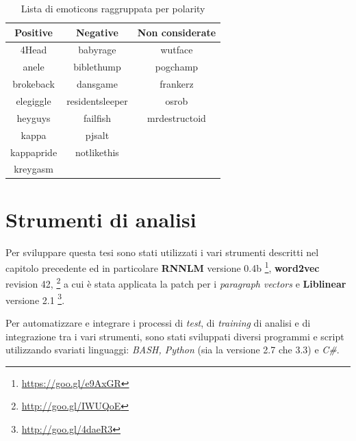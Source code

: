 \documentclass[a4paper,12pt,openright,twoside]{report}
\theoremstyle{definition}
\begin{document}
\begin{table}[H]
\begin{center}
\begin{tabular}{|c|c|c|}
\hline
Positive & Negative & Non considerate \\
\hline
4Head & babyrage & wutface \\
\hline
anele &  biblethump &  pogchamp \\
\hline
brokeback &  dansgame & frankerz \\
\hline
elegiggle & residentsleeper &  osrob \\
\hline
heyguys & failfish & mrdestructoid \\
\hline
kappa & pjsalt & \\
\hline
kappapride & notlikethis & \\
\hline
kreygasm &  & \\
\hline
\end{tabular}
\end{center}
\caption{Lista di emoticons raggruppata per polarity}
\label{tab:emoticons2}
\end{table}

  
\section{Strumenti di analisi}
Per sviluppare questa tesi sono stati utilizzati i vari strumenti descritti 
nel capitolo precedente
ed in particolare \textbf{RNNLM} versione 0.4b \footnote{\url{https://goo.gl/e9AxGR}}, 
\textbf{word2vec} revision 42, \footnote{\url{http://goo.gl/IWUQoE}}
a cui è stata applicata la patch per i \emph{paragraph vectors} e \textbf{Liblinear} versione 2.1 \footnote{\url{http://goo.gl/4daeR3}}.

Per automatizzare e integrare i processi di \emph{test}, di
\emph{training} di analisi e di integrazione tra i vari strumenti,
sono stati sviluppati diversi programmi e script utilizzando svariati linguaggi: \emph{BASH, Python} (sia 
la versione 2.7 che 3.3) e \emph{C\#}.
\end{document}
